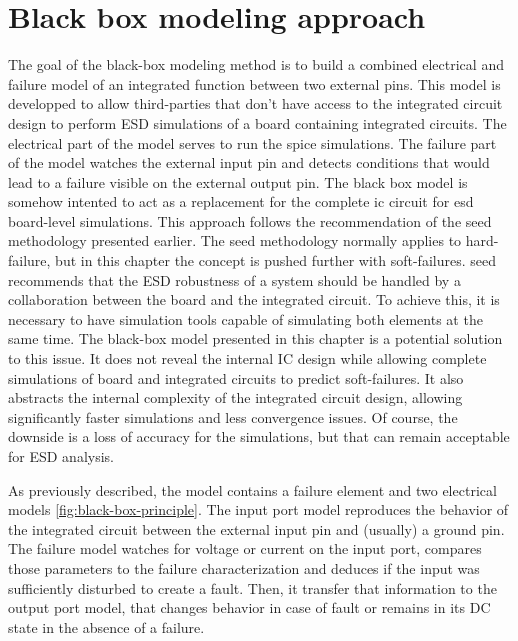 \section{Black box modeling approach}

The goal of the black-box modeling method is to build a combined electrical and failure model of an integrated function between two external pins.
This model is developped to allow third-parties that don't have access to the integrated circuit design to perform ESD simulations of a board containing integrated circuits.
The electrical part of the model serves to run the \gls{spice} simulations.
The failure part of the model watches the external input pin and detects conditions that would lead to a failure visible on the external output pin.
The black box model is somehow intented to act as a replacement for the complete \gls{ic} circuit for \gls{esd} board-level simulations.
This approach follows the recommendation of the \gls{seed} methodology \cite{seed} presented earlier.
The \gls{seed} methodology normally applies to hard-failure, but in this chapter the concept is pushed further with soft-failures.
\gls{seed} recommends that the ESD robustness of a system should be handled by a collaboration between the board and the integrated circuit.
To achieve this, it is necessary to have simulation tools capable of simulating both elements at the same time.
The black-box model presented in this chapter is a potential solution to this issue.
It does not reveal the internal IC design while allowing complete simulations of board and integrated circuits to predict soft-failures.
It also abstracts the internal complexity of the integrated circuit design, allowing significantly faster simulations and less convergence issues.
Of course, the downside is a loss of accuracy for the simulations, but that can remain acceptable for ESD analysis.

As previously described, the model contains a failure element and two electrical models \ref{fig:black-box-principle}.
The input port model reproduces the behavior of the integrated circuit between the external input pin and (usually) a ground pin.
The failure model watches for voltage or current on the input port, compares those parameters to the failure characterization and deduces if the input was sufficiently disturbed to create a fault.
Then, it transfer that information to the output port model, that changes behavior in case of fault or remains in its DC state in the absence of a failure.

